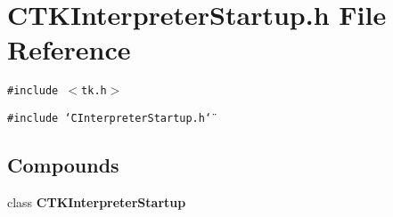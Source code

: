 \section{CTKInterpreter\-Startup.h File Reference}
\label{CTKInterpreterStartup_8h}
{\tt \#include $<$tk.h$>$}\par
{\tt \#include \char`\"{}CInterpreter\-Startup.h\char`\"{}}\par
\subsection*{Compounds}
\begin{CompactItemize}
\item 
class {\bf CTKInterpreter\-Startup}
\end{CompactItemize}
